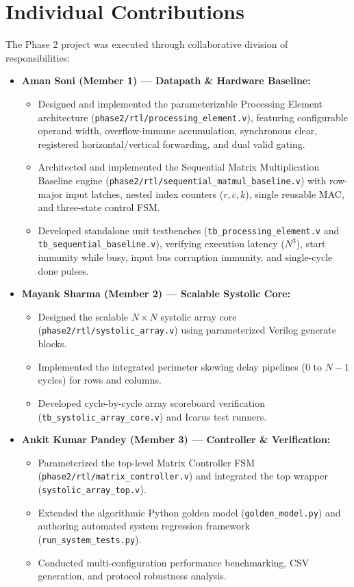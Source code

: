 \documentclass[conference]{IEEEtran}
\begin{document}
\section{Individual Contributions}
The Phase 2 project was executed through collaborative division of responsibilities:
\begin{itemize}
    \item \textbf{Aman Soni (Member 1) --- Datapath \& Hardware Baseline:}
    \begin{itemize}
        \item Designed and implemented the parameterizable Processing Element architecture (\texttt{phase2/rtl/processing\_element.v}), featuring configurable operand width, overflow-immune accumulation, synchronous clear, registered horizontal/vertical forwarding, and dual valid gating.
        \item Architected and implemented the Sequential Matrix Multiplication Baseline engine (\texttt{phase2/rtl/sequential\_matmul\_baseline.v}) with row-major input latches, nested index counters ($r, c, k$), single reusable MAC, and three-state control FSM.
        \item Developed standalone unit testbenches (\texttt{tb\_processing\_element.v} and \texttt{tb\_sequential\_baseline.v}), verifying execution latency ($N^3$), start immunity while busy, input bus corruption immunity, and single-cycle done pulses.
    \end{itemize}
    \item \textbf{Mayank Sharma (Member 2) --- Scalable Systolic Core:}
    \begin{itemize}
        \item Designed the scalable $N \times N$ systolic array core (\texttt{phase2/rtl/systolic\_array.v}) using parameterized Verilog generate blocks.
        \item Implemented the integrated perimeter skewing delay pipelines ($0$ to $N-1$ cycles) for rows and columns.
        \item Developed cycle-by-cycle array scoreboard verification (\texttt{tb\_systolic\_array\_core.v}) and Icarus test runners.
    \end{itemize}
    \item \textbf{Ankit Kumar Pandey (Member 3) --- Controller \& Verification:}
    \begin{itemize}
        \item Parameterized the top-level Matrix Controller FSM (\texttt{phase2/rtl/matrix\_controller.v}) and integrated the top wrapper (\texttt{systolic\_array\_top.v}).
        \item Extended the algorithmic Python golden model (\texttt{golden\_model.py}) and authoring automated system regression framework (\texttt{run\_system\_tests.py}).
        \item Conducted multi-configuration performance benchmarking, CSV generation, and protocol robustness analysis.
    \end{itemize}
\end{itemize}
\end{document}
